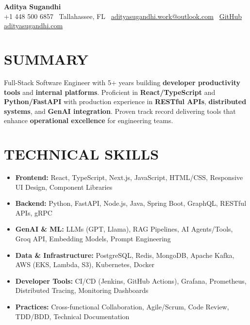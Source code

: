 \documentclass[letterpaper,10pt]{article}
\newcommand{\resumeItem}[1]{\item\small #1}
\begin{document}
\begin{center}
{\huge\textbf{Aditya Sugandhi}} \\
+1 448 500 6857 \textbar\ \textcolor{metablue}{Tallahassee, FL} \textbar\
\href{mailto:adityasugandhi.work@outlook.com}{adityasugandhi.work@outlook.com} \textbar\
\href{https://github.com/adityasugandhi}{GitHub}
\textbar \href{https://adityasugandhi.com}{adityasugandhi.com}
\end{center}
\vspace{-12pt}

\section{\textcolor{metablue}{SUMMARY}}
\small
\vspace{-6pt}
Full-Stack Software Engineer with 5+ years building \textbf{developer productivity tools} and \textbf{internal platforms}. Proficient in \textbf{React/TypeScript} and \textbf{Python/FastAPI} with production experience in \textbf{RESTful APIs}, \textbf{distributed systems}, and \textbf{GenAI integration}. Proven track record delivering tools that enhance \textbf{operational excellence} for engineering teams.

\vspace{-9pt}

\section{\textcolor{metablue}{TECHNICAL SKILLS}}
\vspace{-5pt}
\small
\begin{itemize}
\resumeItem{\textbf{Frontend:} React, TypeScript, Next.js, JavaScript, HTML/CSS, Responsive UI Design, Component Libraries}
\resumeItem{\textbf{Backend:} Python, FastAPI, Node.js, Java, Spring Boot, GraphQL, RESTful APIs, gRPC}
\resumeItem{\textbf{GenAI \& ML:} LLMs (GPT, Llama), RAG Pipelines, AI Agents/Tools, Groq API, Embedding Models, Prompt Engineering}
\resumeItem{\textbf{Data \& Infrastructure:} PostgreSQL, Redis, MongoDB, Apache Kafka, AWS (EKS, Lambda, S3), Kubernetes, Docker}
\resumeItem{\textbf{Developer Tools:} CI/CD (Jenkins, GitHub Actions), Grafana, Prometheus, Distributed Tracing, Monitoring Dashboards}
\resumeItem{\textbf{Practices:} Cross-functional Collaboration, Agile/Scrum, Code Review, TDD/BDD, Technical Documentation}
\end{itemize}
\vspace{-10pt}
\end{document}
